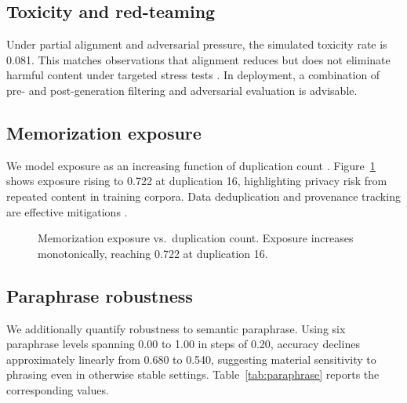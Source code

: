 \documentclass[10pt]{article}
\begin{document}
\subsection{Toxicity and red-teaming}
Under partial alignment and adversarial pressure, the simulated toxicity rate is 0.081. This matches observations that alignment reduces but does not eliminate harmful content under targeted stress tests \citep{Weidinger2021EthicalRisks, Perez2022RedTeam, Bai2022ConstitutionalAI, Gehman2020RealToxicity}. In deployment, a combination of pre- and post-generation filtering and adversarial evaluation is advisable.

\subsection{Memorization exposure}
We model exposure as an increasing function of duplication count \citep{Carlini2021ExtractingTrainingData}. Figure~\ref{fig:memorization} shows exposure rising to 0.722 at duplication 16, highlighting privacy risk from repeated content in training corpora. Data deduplication and provenance tracking are effective mitigations \citep{Lee2022Dedup}.

\begin{figure}[ht]
\centering
{}
\vspace{0.5em}
\caption{Memorization exposure vs.\ duplication count. Exposure increases monotonically, reaching 0.722 at duplication 16.}
\label{fig:memorization}
\end{figure}

\subsection{Paraphrase robustness}
We additionally quantify robustness to semantic paraphrase. Using six paraphrase levels spanning 0.00 to 1.00 in steps of 0.20, accuracy declines approximately linearly from 0.680 to 0.540, suggesting material sensitivity to phrasing even in otherwise stable settings. Table~\ref{tab:paraphrase} reports the corresponding values.
\end{document}
